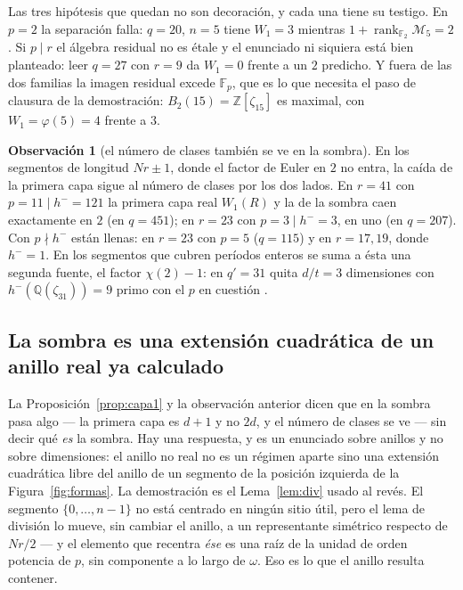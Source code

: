 \documentclass[11pt,a4paper]{article}
\theoremstyle{definition}
\newtheorem{observation}[theorem]{Observaci\'on}
\newcommand{\ZZ}{\mathbb{Z}}
\newcommand{\QQ}{\mathbb{Q}}
\newcommand{\FF}{\mathbb{F}}
\begin{document}
Las tres hip\'otesis que quedan no son decoraci\'on, y cada una tiene su testigo. En $p=2$ la
separaci\'on falla: $q=20$, $n=5$ tiene $W_1=3$ mientras
$1+\operatorname{rank}_{\FF_2}\mathcal M_5=2$. Si $p\mid r$ el \'algebra residual no es \'etale y el
enunciado ni siquiera est\'a bien planteado: leer $q=27$ con $r=9$ da $W_1=0$ frente a un $2$
predicho. Y fuera de las dos familias la imagen residual excede $\FF_p$, que es lo que necesita el
paso de clausura de la demostraci\'on: $B_2(15)=\ZZ[\zeta_{15}]$ es maximal, con
$W_1=\varphi(5)=4$ frente a $3$.

\begin{observation}[el n\'umero de clases tambi\'en se ve en la sombra]
En los segmentos de longitud $Nr\pm1$, donde el factor de Euler en $2$ no entra, la ca\'ida de la
primera capa sigue al n\'umero de clases por los dos lados. En $r=41$ con $p=11\mid h^-=121$ la
primera capa real $W_1(R)$ y la de la sombra caen exactamente en $2$ (en $q=451$); en $r=23$ con
$p=3\mid h^-=3$, en uno (en $q=207$). Con $p\nmid h^-$ est\'an llenas: en $r=23$ con $p=5$
($q=115$) y en $r=17,19$, donde $h^-=1$. En los segmentos que cubren per\'iodos enteros se suma a
\'esta una segunda fuente, el factor $\chi(2)-1$: en $q'=31$ quita $d/t=3$ dimensiones con
$h^-(\QQ(\zeta_{31}))=9$ primo con el $p$ en cuesti\'on \cite{II}.
\end{observation}

\subsection*{La sombra es una extensi\'on cuadr\'atica de un anillo real ya calculado}

La Proposici\'on~\ref{prop:capa1} y la observaci\'on anterior dicen que en la sombra pasa algo --- la primera capa es $d+1$ y no
$2d$, y el n\'umero de clases se ve --- sin decir qu\'e \emph{es} la sombra. Hay una respuesta, y
es un enunciado sobre anillos y no sobre dimensiones: el anillo no real no es un r\'egimen aparte
sino una extensi\'on cuadr\'atica libre del anillo de un segmento de la posici\'on izquierda de la
Figura~\ref{fig:formas}. La demostraci\'on es el Lema~\ref{lem:div} usado al rev\'es. El segmento
$\{0,\dots,n-1\}$ no est\'a centrado en ning\'un sitio \'util, pero el lema de divisi\'on lo mueve,
sin cambiar el anillo, a un representante sim\'etrico respecto de $Nr/2$ --- y el elemento que
recentra \emph{\'ese} es una ra\'iz de la unidad de orden potencia de $p$, sin componente a lo largo
de $\omega$. Eso es lo que el anillo resulta contener.
\end{document}
